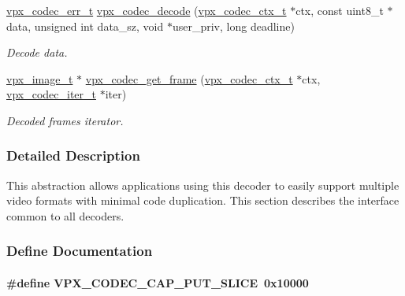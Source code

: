 \begin{DoxyCompactItemize}
\hyperlink{group__codec_gada1084710837ad363b92f2379dd2b8d2}{vpx\-\_\-codec\-\_\-err\-\_\-t} \hyperlink{group__decoder_ga3441e157a7a69108bca9a069f2ee8e0d}{vpx\-\_\-codec\-\_\-decode} (\hyperlink{group__codec_gad03e2dfa6ae511db7d25be6bbb336233}{vpx\-\_\-codec\-\_\-ctx\-\_\-t} $\ast$ctx, const uint8\-\_\-t $\ast$data, unsigned int data\-\_\-sz, void $\ast$user\-\_\-priv, long deadline)
\begin{DoxyCompactList}\small\item\em \-Decode data. \end{DoxyCompactList}\item 
\hyperlink{vpx__image_8h_abf5ac962cc6d71b4f0e39b1b0d033e55}{vpx\-\_\-image\-\_\-t} $\ast$ \hyperlink{group__decoder_ga0e231c3a5ce445fdb2268d741da97500}{vpx\-\_\-codec\-\_\-get\-\_\-frame} (\hyperlink{group__codec_gad03e2dfa6ae511db7d25be6bbb336233}{vpx\-\_\-codec\-\_\-ctx\-\_\-t} $\ast$ctx, \hyperlink{group__codec_ga6ea348f76b1f8a1fe50e14db684146c6}{vpx\-\_\-codec\-\_\-iter\-\_\-t} $\ast$iter)
\begin{DoxyCompactList}\small\item\em \-Decoded frames iterator. \end{DoxyCompactList}\end{DoxyCompactItemize}


\subsubsection{\-Detailed \-Description}
\-This abstraction allows applications using this decoder to easily support multiple video formats with minimal code duplication. \-This section describes the interface common to all decoders. 

\subsubsection{\-Define \-Documentation}
\hypertarget{group__decoder_ga9e33b8ee81025d5fc3d01b0975ad5f96}{
\paragraph[{\-V\-P\-X\-\_\-\-C\-O\-D\-E\-C\-\_\-\-C\-A\-P\-\_\-\-P\-U\-T\-\_\-\-S\-L\-I\-C\-E}]{\setlength{\rightskip}{0pt plus 5cm}\#define \-V\-P\-X\-\_\-\-C\-O\-D\-E\-C\-\_\-\-C\-A\-P\-\_\-\-P\-U\-T\-\_\-\-S\-L\-I\-C\-E~0x10000}}
\label{group__decoder_ga9e33b8ee81025d5fc3d01b0975ad5f96}


